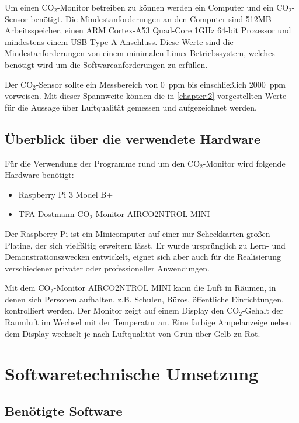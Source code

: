 \documentclass[a4paper,
    12pt,
    headings=small,
    ngerman,
    listof=totoc,
    numbers=noenddot]{scrreprt}[2021/11/13]
\begin{document}
Um einen CO$_2$-Monitor betreiben zu können werden ein Computer und ein CO$_2$-Sensor benötigt. Die Mindestanforderungen an den Computer sind 512MB Arbeitsspeicher, einen ARM Cortex-A53 Quad-Core 1GHz 64-bit Prozessor und mindestens einem USB Type A Anschluss. Diese Werte sind die Mindestanforderungen von einem minimalen Linux Betriebssystem, welches benötigt wird um die Softwareanforderungen zu erfüllen.

Der CO$_2$-Sensor sollte ein Messbereich von \SI{0}{ppm} bis einschließlich \SI{2000}{ppm} vorweisen. Mit dieser Spannweite können die in \vref{chapter:2} vorgestellten Werte für die Aussage über Luftqualität gemessen und aufgezeichnet werden.


\section{Überblick über die verwendete Hardware}

Für die Verwendung der Programme rund um den CO$_2$-Monitor wird folgende Hardware benötigt:

\begin{itemize}
  \item Raspberry Pi 3 Model B+
  \item TFA-Dostmann CO$_2$-Monitor AIRCO2NTROL MINI
\end{itemize}

Der Raspberry Pi ist ein Minicomputer auf einer nur Scheckkarten-großen Platine, der sich vielfältig erweitern lässt.
Er wurde ursprünglich zu Lern- und Demonstrationszwecken entwickelt, eignet sich aber auch für die
Realisierung verschiedener privater oder professioneller Anwendungen.

Mit dem CO$_2$-Monitor AIRCO2NTROL MINI kann die Luft in Räumen,
in denen sich Personen aufhalten, z.B. Schulen, Büros, öffentliche Einrichtungen, kontrolliert werden. Der Monitor zeigt auf einem Display den CO$_2$-Gehalt der Raumluft im Wechsel mit der Temperatur an. Eine farbige Ampelanzeige neben dem Display wechselt je nach Luftqualität von Grün über Gelb zu Rot.



\chapter{Softwaretechnische Umsetzung}


\section{Benötigte Software}
\end{document}
